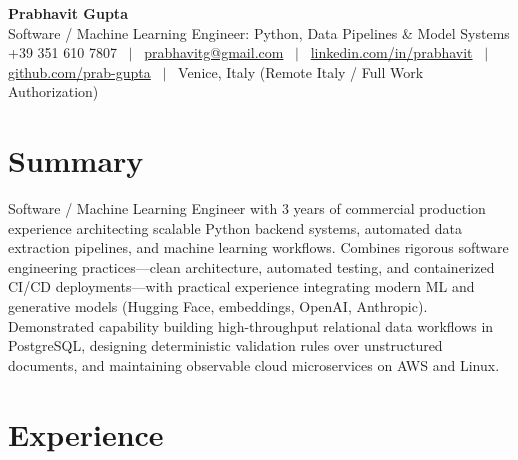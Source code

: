 \documentclass[a4paper,10pt]{article}
\begin{document}
\begin{minipage}[c]{0.80\textwidth}
 {\Huge\bfseries Prabhavit Gupta}\\[3pt]
 {\color{accent}\large Software / Machine Learning Engineer: Python, Data Pipelines \& Model Systems}\\[6pt]
 {\footnotesize +39 351 610 7807 ~$\vert$~
 \href{mailto:prabhavitg@gmail.com}{prabhavitg@gmail.com} ~$\vert$~
 \href{https://www.linkedin.com/in/prabhavit/}{linkedin.com/in/prabhavit} ~$\vert$~
 \href{https://github.com/prab-gupta}{github.com/prab-gupta} ~$\vert$~
 Venice, Italy (Remote Italy / Full Work Authorization)}
\end{minipage}\hfill

\section{Summary}
Software / Machine Learning Engineer with 3 years of commercial production experience architecting scalable Python backend systems, automated data extraction pipelines, and machine learning workflows. Combines rigorous software engineering practices---clean architecture, automated testing, and containerized CI/CD deployments---with practical experience integrating modern ML and generative models (Hugging Face, embeddings, OpenAI, Anthropic). Demonstrated capability building high-throughput relational data workflows in PostgreSQL, designing deterministic validation rules over unstructured documents, and maintaining observable cloud microservices on AWS and Linux.

\section{Experience}
\end{document}
